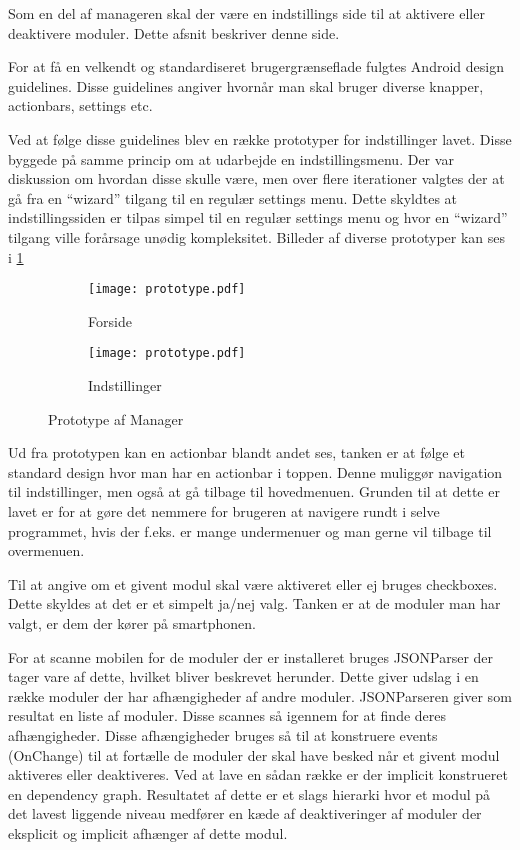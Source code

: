 Som en del af manageren skal der være en indstillings side til at aktivere eller deaktivere moduler. Dette afsnit beskriver denne side.

For at få en velkendt og standardiseret brugergrænseflade fulgtes Android design guidelines.
Disse guidelines angiver hvornår man skal bruger diverse knapper, actionbars, settings etc.
\citep{androiddesign}

Ved at følge disse guidelines blev en række prototyper for indstillinger lavet.
Disse byggede på samme princip om at udarbejde en indstillingsmenu.
Der var diskussion om hvordan disse skulle være, men over flere iterationer valgtes der at gå fra en ``wizard'' tilgang til en regulær settings menu.
Dette skyldtes at indstillingssiden er tilpas simpel til en regulær settings menu og hvor en ``wizard'' tilgang ville forårsage unødig kompleksitet.
Billeder af diverse prototyper kan ses i \cref{fig:prototype-manager}

\begin{figure}[!h]
	\centering
	\begin{subfigure}[b]{0.45\textwidth}
			\texttt{[image: prototype.pdf]}
			\caption{Forside}
	\end{subfigure}
	\begin{subfigure}[b]{0.45\textwidth}
			\texttt{[image: prototype.pdf]}
			\caption{Indstillinger}
	\end{subfigure}
	\caption{Prototype af Manager}
	\label{fig:prototype-manager}
\end{figure}


Ud fra prototypen kan en actionbar blandt andet ses, tanken er at følge et standard design hvor man har en actionbar i toppen.
Denne muliggør navigation til indstillinger, men også at gå tilbage til hovedmenuen.
Grunden til at dette er lavet er for at gøre det nemmere for brugeren at navigere rundt i selve programmet, hvis der f.eks. er mange undermenuer og man gerne vil tilbage til overmenuen.

Til at angive om et givent modul skal være aktiveret eller ej bruges checkboxes.
Dette skyldes at det er et simpelt ja/nej valg. 
Tanken er at de moduler man har valgt, er dem der kører på smartphonen.

For at scanne mobilen for de moduler der er installeret bruges JSONParser der tager vare af dette, hvilket bliver beskrevet herunder.
Dette giver udslag i en række moduler der har afhængigheder af andre moduler.
JSONParseren giver som resultat en liste af moduler. Disse scannes så igennem for at finde deres afhængigheder.
Disse afhængigheder bruges så til at konstruere events (OnChange) til at fortælle de moduler der skal have besked når et givent modul aktiveres eller deaktiveres.
Ved at lave en sådan række er der implicit konstrueret en dependency graph.
Resultatet af dette er et slags hierarki hvor et modul på det lavest liggende niveau medfører en kæde af deaktiveringer af moduler der eksplicit og implicit afhænger af dette modul.

